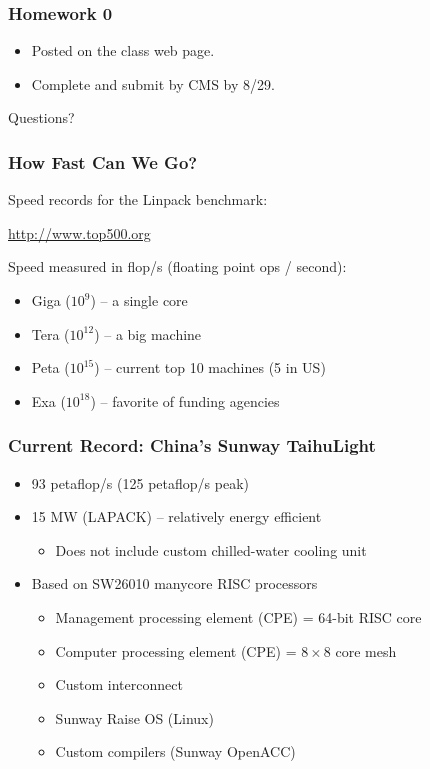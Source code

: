 \documentclass{beamer}
\begin{document}
\begin{frame}
  \frametitle{Homework 0}

  \begin{itemize}
  \item Posted on the class web page.
  \item Complete and submit by CMS by 8/29.
  \end{itemize}
  
\end{frame}


\begin{frame}
  \begin{center}
    {\large Questions?}
  \end{center}
\end{frame}


\begin{frame}
  \frametitle{How Fast Can We Go?}
  
  Speed records for the Linpack benchmark:
  \begin{center}
  {\small \url{http://www.top500.org}}
  \end{center}

  \vspace{1cm}
  Speed measured in flop/s (floating point ops / second):
  \begin{itemize}
  \item Giga ($10^9$) -- a single core
  \item Tera ($10^{12}$) -- a big machine
  \item Peta ($10^{15}$) -- current top 10 machines (5 in US)
  \item Exa ($10^{18}$) -- favorite of funding agencies
  \end{itemize}

\end{frame}


\begin{frame}
  \frametitle{Current Record: China's Sunway TaihuLight}
  
  \begin{itemize}
  \item 93 petaflop/s (125 petaflop/s peak)
  \item 15 MW (LAPACK) -- relatively energy efficient
    \begin{itemize}
    \item Does not include custom chilled-water cooling unit
    \end{itemize}
  \item Based on SW26010 manycore RISC processors
    \begin{itemize}
    \item Management processing element (CPE) = 64-bit RISC core
    \item Computer processing element (CPE) = $8 \times 8$ core mesh
    \item Custom interconnect
    \item Sunway Raise OS (Linux)
    \item Custom compilers (Sunway OpenACC)
    \end{itemize}
  \end{itemize}
\end{frame}
\end{document}
